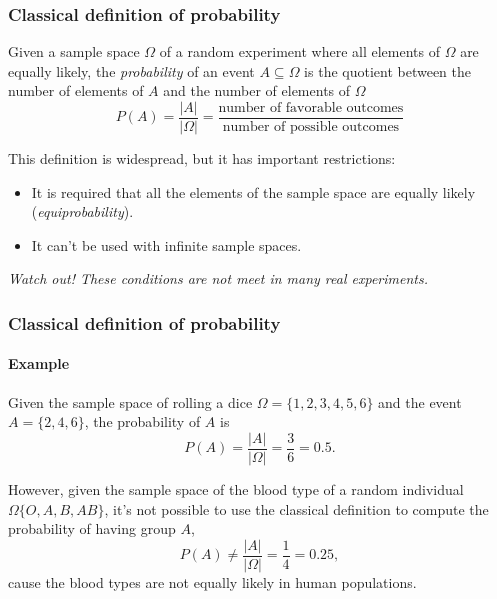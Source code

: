 \begin{frame}
\frametitle{Classical definition of probability}
\begin{definition}
Given a sample space $\Omega$ of a random experiment where all elements of $\Omega$ are equally likely, the
\emph{probability} of an event $A\subseteq \Omega$ is the quotient between the number of elements of $A$ and the number
of elements of $\Omega$
\[ P(A) = \frac{|A|}{|\Omega|} = \frac{\mbox{number of favorable outcomes}}{\mbox{number of possible outcomes}}\]
\end{definition}

This definition is widespread, but it has important restrictions:
\begin{itemize}
\item It is required that all the elements of the sample space are equally likely (\emph{equiprobability}).
\item It can't be used with infinite sample spaces.
\end{itemize}

\alert{\emph{Watch out! These conditions are not meet in many real experiments.}}
\end{frame}


\begin{frame}
\frametitle{Classical definition of probability}
\framesubtitle{Example}
Given the sample space of rolling a dice $\Omega=\{1,2,3,4,5,6\}$ and the event $A=\{2,4,6\}$, the probability of $A$ is 
\[
P(A) = \frac{|A|}{|\Omega|} = \frac{3}{6} = 0.5.
\]

However, given the sample space of the blood type of a random individual $\Omega\{O,A,B,AB\}$, it's not possible to use
the classical definition to compute the probability of having group $A$,
\[
P(A) \neq \frac{|A|}{|\Omega|} = \frac{1}{4} = 0.25,
\]
cause the blood types are not equally likely in human populations. 
\end{frame}


